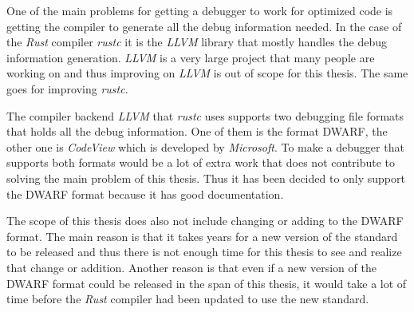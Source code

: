 




One of the main problems for getting a debugger to work for optimized code is getting the compiler to generate all the debug information needed.
In the case of the \emph{Rust} compiler \emph{rustc} it is the \emph{LLVM} library that mostly handles the debug information generation.
\emph{LLVM} is a very large project that many people are working on and thus improving on \emph{LLVM} is out of scope for this thesis.
The same goes for improving \emph{rustc}.


The compiler backend \emph{LLVM} that \emph{rustc} uses supports two debugging file formats that holds all the debug information.
One of them is the format \gls{DWARF}, the other one is \emph{CodeView} which is developed by \emph{Microsoft}.
To make a debugger that supports both formats would be a lot of extra work that does not contribute to solving the main problem of this thesis.
Thus it has been decided to only support the \gls{DWARF} format because it has good documentation.


The scope of this thesis does also not include changing or adding to the \gls{DWARF} format.
The main reason is that it takes years for a new version of the standard to be released and thus there is not enough time for this thesis to see and realize that change or addition.
Another reason is that even if a new version of the \gls{DWARF} format could be released in the span of this thesis, it would take a lot of time before the \emph{Rust} compiler had been updated to use the new standard.


